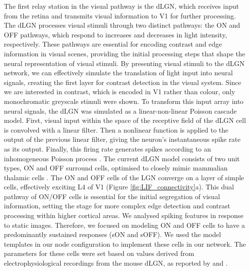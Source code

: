 \documentclass[12pt]{article}
\begin{document}
The first relay station in the visual pathway is the dLGN, which receives input from the retina and transmits visual information to V1 for further processing. The dLGN processes visual stimuli through two distinct pathways: the ON and OFF pathways, which respond to increases and decreases in light intensity, respectively. These pathways are essential for encoding contrast and edge information in visual scenes, providing the initial processing steps that shape the neural representation of visual stimuli. By presenting visual stimuli to the dLGN network, we can effectively simulate the translation of light input into neural signals, creating the first layer for contrast detection in the visual system. Since we are interested in contrast, which is encoded in V1 rather than colour, only monochromatic greyscale stimuli were shown. To transform this input array into neural signals, the dLGN was simulated as a linear-non-linear Poisson cascade model. First, visual input within the space of the receptive field of the dLGN cell is convolved with a linear filter. Then a nonlinear function is applied to the output of the previous linear filter, giving the neuron's instantaneous spike rate as its output. Finally, this firing rate generates spikes according to an inhomogeneous Poisson process \autocite{moskovitzComparisonDeepLearning2018}. The current dLGN model consists of two unit types, ON and OFF surround cells, optimised to closely mimic mammalian thalamic cells \autocite{billehSystematicIntegrationStructural2020}. The ON and OFF cells of the LGN converge on a layer of simple cells, effectively exciting L4 of V1 (Figure \ref{fig:LIF_connectivity}a). This dual pathway of ON/OFF cells is essential for the initial segregation of visual information, setting the stage for more complex edge detection and contrast processing within higher cortical areas. We analysed spiking features in response to static images. Therefore, we focused on modeling ON and OFF cells to have a predominantly sustained responses (sON and sOFF). We used the model templates in our node configuration to implement these cells in our network. The parameters for these cells were set based on values derived from electrophysiological recordings from the mouse dLGN, as reported by \textcite{durandComparisonVisualResponse2016} and \textcite{billehSystematicIntegrationStructural2020}.
\end{document}
